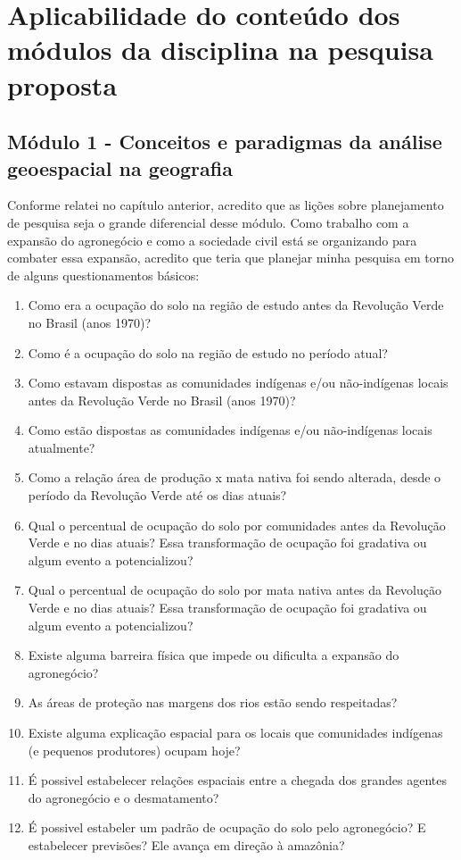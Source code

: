 \section{Aplicabilidade do conteúdo dos módulos da disciplina na pesquisa proposta}

\subsection{Módulo 1 - Conceitos e paradigmas da análise geoespacial na geografia}

Conforme relatei no capítulo anterior, acredito que as lições sobre planejamento de pesquisa seja o grande diferencial desse módulo. Como trabalho com a expansão do agronegócio e como a sociedade civil está se organizando para combater essa expansão, acredito que teria que planejar minha pesquisa em torno de alguns questionamentos básicos:

\begin{enumerate}
  \item Como era a ocupação do solo na região de estudo antes da Revolução Verde no Brasil (anos 1970)?
  \item Como é a ocupação do solo na região de estudo no período atual?
  \item Como estavam dispostas as comunidades indígenas e/ou não-indígenas locais antes da Revolução Verde no Brasil (anos 1970)?
  \item Como estão dispostas as comunidades indígenas e/ou não-indígenas locais atualmente?
  \item Como a relação área de produção x mata nativa foi sendo alterada, desde o período da Revolução Verde até os dias atuais?
  \item Qual o percentual de ocupação do solo por comunidades antes da Revolução Verde e no dias atuais? Essa transformação de ocupação foi gradativa ou algum evento a potencializou?
  \item Qual o percentual de ocupação do solo por mata nativa antes da Revolução Verde e no dias atuais? Essa transformação de ocupação foi gradativa ou 
algum evento a potencializou?
  \item Existe alguma barreira física que impede ou dificulta a expansão do agronegócio?
  \item As áreas de proteção nas margens dos rios estão sendo respeitadas?
  \item Existe alguma explicação espacial para os locais que comunidades indígenas (e pequenos produtores) ocupam hoje?
  \item É possivel estabelecer relações espaciais entre a chegada dos grandes agentes do agronegócio e o desmatamento?
  \item É possivel estabeler um padrão de ocupação do solo pelo agronegócio? E estabelecer previsões? Ele avança em direção à amazônia?
\end{enumerate}

